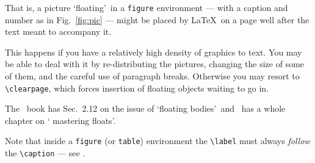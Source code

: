 That is, a picture \lq floating\rq\ in a \texttt{figure} environment
--- with a caption and number as in Fig.~\ref{fig:pic} --- might be
placed by \LaTeX\ on a page well after the text meant to accompany it.
\par
This happens if you have a relatively high density of graphics to
text. You may be able to deal with it by re-distributing the
pictures, changing the size of some of them, and the careful use of
paragraph breaks. Otherwise you may resort to \verb+\clearpage+,
which forces insertion of floating objects waiting to go in.
\par
The \nss\ book \cite{NSS} has Sec.~2.12 on the issue of \lq floating
bodies\rq\ and \comp\ has a whole chapter \cite[Chap.~6]{MG} on \lq
mastering floats'.
\par
Note that inside a \verb+figure+ (or \verb+table+) environment the 
\verb+\label+ must always {\em follow} the \verb+\caption+ --- see 
\cite[p.~67]{MG}.
\par
